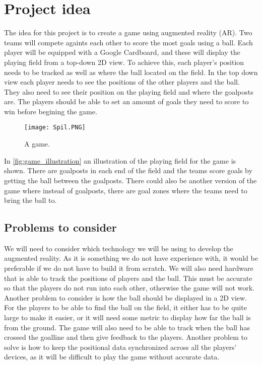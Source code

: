 \section{Project idea}
The idea for this project is to create a game using augmented reality (AR). 
Two teams will compete againts each other to score the most goals using a ball. 
Each player will be equipped with a Google Cardboard, and these will display the playing field from a top-down 2D view. 
To achieve this, each player's position needs to be tracked as well as where the ball located on the field.
In the top down view each player needs to see the positions of the other players and the ball.
They also need to see their position on the playing field and where the goalposts are.
The players should be able to set an amount of goals they need to score to win before begining the game. 
\begin{figure}[H]
    \centering
    \texttt{[image: Spil.PNG]}
    \caption{A game.}
    \label{fig:game_illustration}
\end{figure}
In \autoref{fig:game_illustration} an illustration of the playing field for the game is shown. There are goalposts in each end of the field and the teams score goals by getting the ball between the goalposts. There could also be another version of the game where instead of goalposts, there are goal zones where the teams need to bring the ball to.
\subsection{Problems to consider}
We will need to consider which technology we will be using to develop the augmented reality. 
As it is something we do not have experience with, it would be preferable if we do not have to build it from scratch.
We will also need hardware that is able to track the positions of players and the ball.
This must be accurate so that the players do not run into each other, otherwise the game will not work.
Another problem to consider is how the ball should be displayed in a 2D view.
For the players to be able to find the ball on the field, it either has to be quite large to make it easier, or it will need some metric to display how far the ball is from the ground.
The game will also need to be able to track when the ball has crossed the goalline and then give feedback to the players.
Another problem to solve is how to keep the positional data synchronized across all the players' devices, as it will be difficult to play the game without accurate data.
